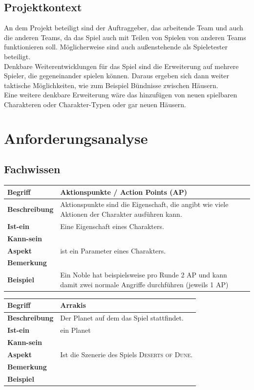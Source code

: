 \documentclass[12pt]{article}
\begin{document}
\subsection{Projektkontext}

An dem Projekt beteiligt sind der Auftraggeber, das arbeitende Team und auch die anderen Teams, da das Spiel auch mit Teilen von Spielen von anderen Teams funktionieren soll. Möglicherweise sind auch außenstehende als Spieletester beteiligt. \\
Denkbare Weiterentwicklungen für das Spiel sind die Erweiterung auf mehrere Spieler, die gegeneinander spielen können. Daraus ergeben sich dann weiter taktische Möglichkeiten, wie zum Beispiel Bündnisse zwischen Häusern. \\
Eine weitere denkbare Erweiterung wäre das hinzufügen von neuen spielbaren Charakteren oder Charakter-Typen oder gar neuen Häusern. 

\section{Anforderungsanalyse}
\subsection{Fachwissen}

\begin{tabularx}{\linewidth}{|l|X|}
\hline
\textbf{Begriff} & \textbf{Aktionspunkte / Action Points (AP)} \\
\hline
\textbf{Beschreibung} & Aktionspunkte sind die Eigenschaft, die angibt wie viele Aktionen der Charakter ausführen kann. \\
\hline
\textbf{Ist-ein} & Eine Eigenschaft eines Charakters.\\
\hline
\textbf{Kann-sein} & \\
\hline
\textbf{Aspekt} & ist ein Parameter eines Charakters. \\
\hline
\textbf{Bemerkung} & \\
\hline
\textbf{Beispiel} & Ein Noble hat beispielsweise pro Runde 2 AP  und kann damit zwei normale Angriffe durchführen (jeweils 1 AP)\\
\hline
\end{tabularx}

\begin{tabularx}{\linewidth}{|l|X|}
\hline
\textbf{Begriff} & \textbf{Arrakis} \\
\hline
\textbf{Beschreibung} & Der Planet auf dem das Spiel stattfindet.\\
\hline
\textbf{Ist-ein} & ein Planet\\
\hline
\textbf{Kann-sein} & \\
\hline
\textbf{Aspekt} & Ist die Szenerie des Spiels \textsc{Deserts of Dune}. \\
\hline
\textbf{Bemerkung} & \\
\hline
\textbf{Beispiel} &  \\
\hline
\end{tabularx}
\end{document}

